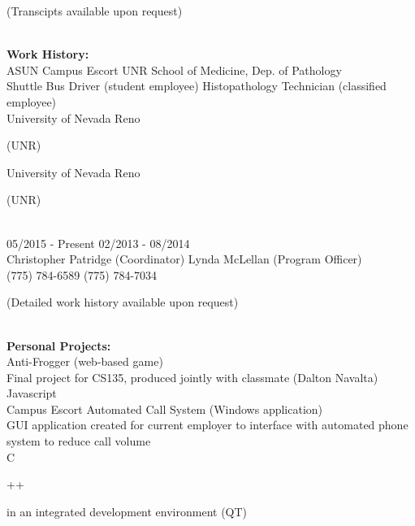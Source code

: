 \documentclass[8pt]{paper}
\begin{document}
\begin{flushleft}
\begin{small}(Transcipts available upon request)\end{small}\\
[2mm]

\large{\bfseries{Work History:}}\\
[2mm]

ASUN Campus Escort \hspace{70mm} UNR School of Medicine, Dep. of Pathology\\
Shuttle Bus Driver (student employee) \hspace{41mm} Histopathology Technician (classified employee)\\
University of Nevada Reno \begin{small}(UNR)
\end{small} \hspace{49.5mm} University of Nevada Reno \begin{small}(UNR)\end{small}\\
05/2015 - Present \hspace{79mm} 02/2013 - 08/2014\\
Christopher Patridge (Coordinator) \hspace{46mm} Lynda McLellan (Program Officer)\\
(775) 784-6589 \hspace{84mm} (775) 784-7034\\

\begin{small}(Detailed work history available upon request)\end{small}\\
[2mm]

\large{\bfseries{Personal Projects:}}\\
[2mm]

Anti-Frogger (web-based game)\\
Final project for CS135, produced jointly with classmate (Dalton Navalta)\\
Javascript\\
[1mm]
Campus Escort Automated Call System (Windows application)\\
GUI application created for current employer to interface with automated phone system to reduce call volume\\
C\begin{small}++\end{small} in an integrated development environment (QT)\\
[2mm]


\end{flushleft}
\end{document}
